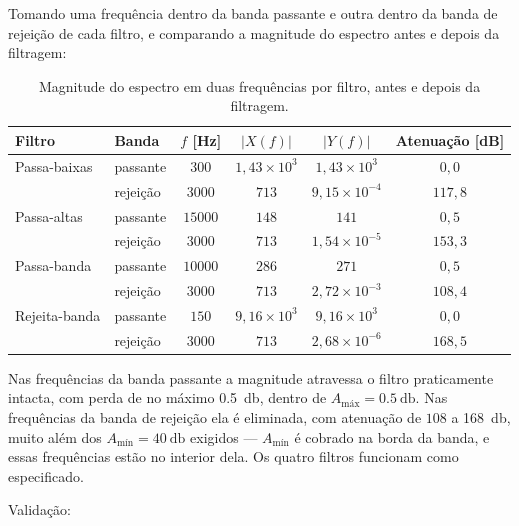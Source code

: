 \documentclass[11pt,a4paper]{article}
\begin{document}
Tomando uma frequência dentro da banda passante e outra dentro da banda de rejeição de
cada filtro, e comparando a magnitude do espectro antes e depois da filtragem:

\begin{table}[H]
\centering
\caption{Magnitude do espectro em duas frequências por filtro, antes e depois da
filtragem.}
\begin{tabular}{llcccc}
\toprule
\textbf{Filtro} & \textbf{Banda} & $f$ \textbf{[Hz]} & $|X(f)|$ & $|Y(f)|$ &
\textbf{Atenuação [dB]} \\
\midrule
Passa-baixas  & passante & $300$   & $1{,}43\times10^3$ & $1{,}43\times10^3$ & $0{,}0$   \\
              & rejeição & $3000$  & $713$              & $9{,}15\times10^{-4}$         & $117{,}8$ \\
\midrule
Passa-altas   & passante & $15000$ & $148$              & $141$              & $0{,}5$   \\
              & rejeição & $3000$  & $713$              & $1{,}54\times10^{-5}$       & $153{,}3$ \\
\midrule
Passa-banda   & passante & $10000$ & $286$              & $271$              & $0{,}5$   \\
              & rejeição & $3000$  & $713$              & $2{,}72\times10^{-3}$         & $108{,}4$ \\
\midrule
Rejeita-banda & passante & $150$   & $9{,}16\times10^3$ & $9{,}16\times10^3$ & $0{,}0$   \\
              & rejeição & $3000$  & $713$              & $2{,}68\times10^{-6}$      & $168{,}5$ \\
\bottomrule
\end{tabular}
\end{table}

Nas frequências da banda passante a magnitude atravessa o filtro praticamente intacta,
com perda de no máximo \SI{0.5}{\decibel}, dentro de
$A_{\text{máx}} = \SI{0.5}{\decibel}$. Nas frequências da banda de rejeição ela é
eliminada, com atenuação de $108$ a \SI{168}{\decibel}, muito além dos
$A_{\text{mín}} = \SI{40}{\decibel}$ exigidos --- $A_{\text{mín}}$ é cobrado na borda da
banda, e essas frequências estão no interior dela. Os quatro filtros funcionam como
especificado.

Validação:
\end{document}

